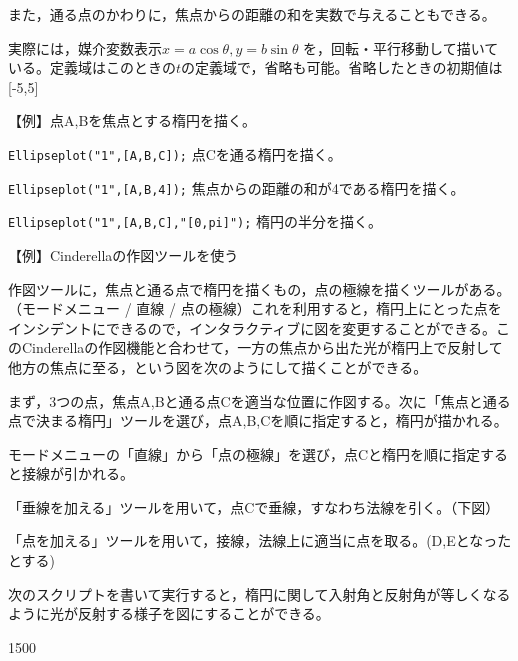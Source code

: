 \documentclass[papersize,a4paper,10pt,uplatex]{jsarticle}
\begin{document}
\begin{description}
また，通る点のかわりに，焦点からの距離の和を実数で与えることもできる。

実際には，媒介変数表示$x=a \cos \theta,y=b \sin \theta$ を，回転・平行移動して描いている。定義域はこのときの$t$の定義域で，省略も可能。省略したときの初期値は[-5,5]

\vspace{\baselineskip}
【例】点A,Bを焦点とする楕円を描く。

\verb|Ellipseplot("1",[A,B,C]);| 点Cを通る楕円を描く。

\verb|Ellipseplot("1",[A,B,4]);| 焦点からの距離の和が4である楕円を描く。

\verb|Ellipseplot("1",[A,B,C],"[0,pi]");| 楕円の半分を描く。

\vspace{\baselineskip}
【例】Cinderellaの作図ツールを使う

作図ツールに，焦点と通る点で楕円を描くもの，点の極線を描くツールがある。（モードメニュー / 直線 / 点の極線）これを利用すると，楕円上にとった点をインシデントにできるので，インタラクティブに図を変更することができる。このCinderellaの作図機能と合わせて，一方の焦点から出た光が楕円上で反射して他方の焦点に至る，という図を次のようにして描くことができる。

まず，3つの点，焦点A,Bと通る点Cを適当な位置に作図する。次に「焦点と通る点で決まる楕円」ツールを選び，点A,B,Cを順に指定すると，楕円が描かれる。

モードメニューの「直線」から「点の極線」を選び，点Cと楕円を順に指定すると接線が引かれる。

「垂線を加える」ツールを用いて，点Cで垂線，すなわち法線を引く。（下図）

「点を加える」ツールを用いて，接線，法線上に適当に点を取る。(D,Eとなったとする)

次のスクリプトを書いて実行すると，楕円に関して入射角と反射角が等しくなるように光が反射する様子を図にすることができる。

\vspace{\baselineskip}
\begin{layer}{150}{0}
\end{layer}
\hspace{50mm}


\end{description}
\end{document}
